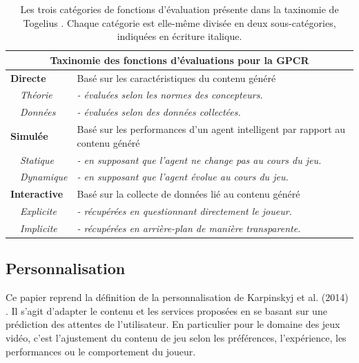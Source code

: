 \documentclass[a4paper,11pt]{article}
\begin{document}
        \begin{table}
          \begin{tabularx}{\linewidth}{|p{2.2cm} X|}
            \hline
              \multicolumn{2}{|c|}{\textbf{Taxinomie des fonctions d'évaluations pour la GPCR}} \\
            \hline
              \textbf{Directe} & Basé sur les caractéristiques du contenu généré \\
              ~~\textit{Théorie} & \textit{- évaluées selon les normes des concepteurs.} \\ 
              ~~\textit{Données} & \textit{- évaluées selon des données collectées.} \\
            \hline
              \textbf{Simulée} & Basé sur les performances d'un agent intelligent par rapport au contenu généré \\
              ~~\textit{Statique} & \textit{- en supposant que l'agent ne change pas au cours du jeu.} \\
              ~~\textit{Dynamique} & \textit{- en supposant que l'agent évolue au cours du jeu.} \\
            \hline
              \textbf{Interactive} & Basé sur la collecte de données lié au contenu généré \\
              ~~\textit{Explicite} & \textit{- récupérées en questionnant directement le joueur.} \\
              ~~\textit{Implicite} & \textit{- récupérées en arrière-plan de manière transparente.} \\
            \hline
          \end{tabularx}
          \caption{Les trois catégories de fonctions d'évaluation présente dans la taxinomie de Togelius \cite{Togelius}. Chaque catégorie est elle-même divisée en deux sous-catégories, indiquées en écriture italique.}
          \label{table:fitness-functions}
        \end{table}

      \subsection{Personnalisation}\label{section:defs-personnalization}

        Ce papier reprend la définition de la personnalisation de Karpinskyj et al. (2014) \cite{Karpinskyj}.
        Il s'agit d'adapter le contenu et les services proposées en se basant sur une prédiction des attentes de l'utilisateur.
        En particulier pour le domaine des jeux vidéo, c'est l'ajustement du contenu de jeu selon les préférences, l'expérience, les performances ou le comportement du joueur.
\end{document}
